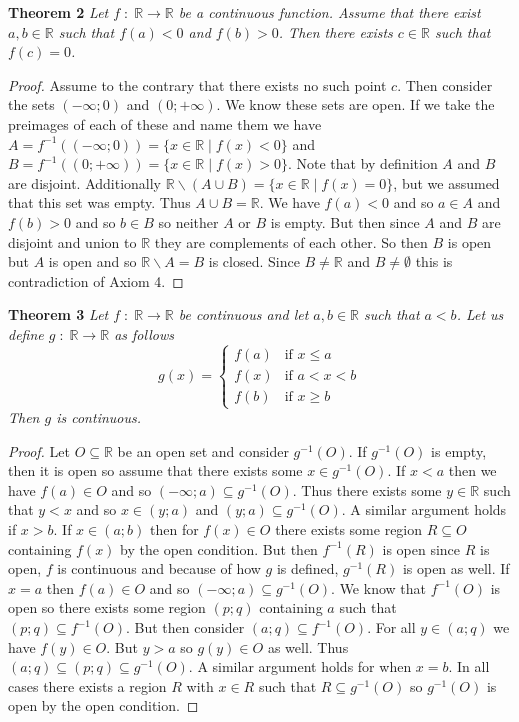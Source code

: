 \documentclass{article}
\begin{document}
\begin{flushleft}
\textbf{Theorem 2}
\textsl{Let $f \; : \; \mathbb{R} \rightarrow \mathbb{R}$ be a continuous function. Assume that there exist $a,b \in \mathbb{R}$ such that $f(a)<0$ and $f(b)>0$. Then there exists $c \in \mathbb{R}$ such that $f(c)=0$.}
\begin{proof}
Assume to the contrary that there exists no such point $c$. Then consider the sets $(- \infty ; 0)$ and $(0 ; + \infty)$. We know these sets are open. If we take the preimages of each of these and name them we have $A=f^{-1} ((- \infty ; 0)) = \{x \in \mathbb{R} \mid f(x) < 0\}$ and $B=f^{-1} ((0 ; + \infty)) = \{x \in \mathbb{R} \mid f(x) > 0\}$. Note that by definition $A$ and $B$ are disjoint. Additionally $\mathbb{R} \backslash (A \cup B) = \{x \in \mathbb{R} \mid f(x)=0\}$, but we assumed that this set was empty. Thus $A \cup B = \mathbb{R}$. We have $f(a)<0$ and so $a \in A$ and $f(b)>0$ and so $b \in B$ so neither $A$ or $B$ is empty. But then since $A$ and $B$ are disjoint and union to $\mathbb{R}$ they are complements of each other. So then $B$ is open but $A$ is open and so $\mathbb{R} \backslash A=B$ is closed. Since $B \neq \mathbb{R}$ and $B \neq \emptyset$ this is contradiction of Axiom 4.
\end{proof}

\textbf{Theorem 3}
\textsl{Let $f \; : \; \mathbb{R} \rightarrow \mathbb{R}$ be continuous and let $a,b \in \mathbb{R}$ such that $a<b$. Let us define $g \; : \; \mathbb{R} \rightarrow \mathbb{R}$ as follows
\[
g(x)=
\begin{cases}
f(a) & \text{if $x \leq a$}\\
f(x) & \text{if $a<x<b$}\\
f(b) & \text{if $x \geq b$}
\end{cases}
\]
Then $g$ is continuous.}
\begin{proof}
Let $O \subseteq \mathbb{R}$ be an open set and consider $g^{-1}(O)$. If $g^{-1}(O)$ is empty, then it is open so assume that there exists some $x \in g^{-1}(O)$. If $x < a$ then we have $f(a) \in O$ and so $(- \infty ; a) \subseteq g^{-1}(O)$. Thus there exists some $y \in \mathbb{R}$ such that $y<x$ and so $x \in (y;a)$ and $(y;a) \subseteq g^{-1}(O)$. A similar argument holds if $x > b$. If $x \in (a;b)$ then for $f(x) \in O$ there exists some region $R \subseteq O$ containing $f(x)$ by the open condition. But then $f^{-1}(R)$ is open since $R$ is open, $f$ is continuous and because of how $g$ is defined, $g^{-1}(R)$ is open as well. If $x=a$ then $f(a) \in O$ and so $(-\infty ; a) \subseteq g^{-1}(O)$. We know that $f^{-1}(O)$ is open so there exists some region $(p;q)$ containing $a$ such that $(p;q) \subseteq f^{-1}(O)$. But then consider $(a;q) \subseteq f^{-1}(O)$. For all $y \in (a;q)$ we have $f(y) \in O$. But $y>a$ so $g(y) \in O$ as well. Thus $(a;q) \subseteq (p;q) \subseteq g^{-1}(O)$. A similar argument holds for when $x=b$. In all cases there exists a region $R$ with $x \in R$ such that $R \subseteq g^{-1}(O)$ so $g^{-1}(O)$ is open by the open condition.
\end{proof}


\end{flushleft}
\end{document}
